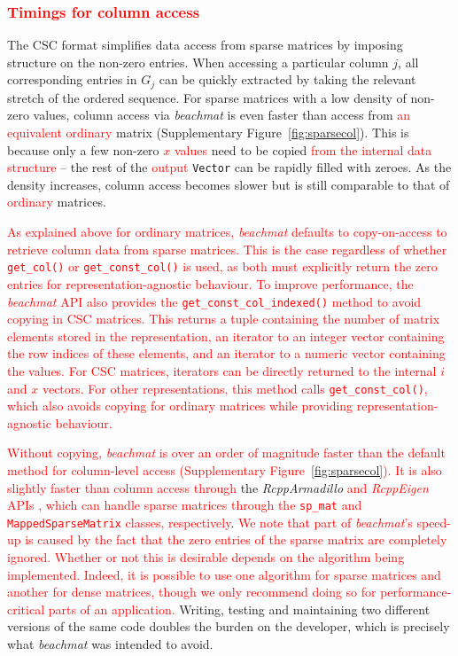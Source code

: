 \documentclass{article}
\newcommand{\beachmat}{\textit{beachmat}}
\newcommand{\code}[1]{\texttt{#1}}
\newcommand{\revised}[1]{\textcolor{red}{#1}}
\begin{document}

\subsubsection{\revised{Timings for column access}}
The CSC format simplifies data access from sparse matrices by imposing structure on the non-zero entries.
When accessing a particular column $j$, all corresponding entries in $G_j$ can be quickly extracted by taking the relevant stretch of the ordered sequence.
For sparse matrices with a low density of non-zero values, column access via \beachmat{} is even faster than access from \revised{an equivalent ordinary} matrix (Supplementary Figure~\ref{fig:sparsecol}).
This is because only a few non-zero \revised{$x$ values} need to be copied \revised{from the internal data structure} -- the rest of the \revised{output} \code{Vector} can be rapidly filled with zeroes.
As the density increases, column access becomes slower but is still comparable to that of \revised{ordinary} matrices.

\revised{As explained above for ordinary matrices, \beachmat{} defaults to copy-on-access to retrieve column data from sparse matrices.
This is the case regardless of whether \code{get\_col()} or \code{get\_const\_col()} is used, as both must explicitly return the zero entries for representation-agnostic behaviour.
To improve performance, the \beachmat{} API also provides the \code{get\_const\_col\_indexed()} method to avoid copying in CSC matrices.
This returns a tuple containing the number of matrix elements stored in the representation, an iterator to an integer vector containing the row indices of these elements, and an iterator to a numeric vector containing the values.
For CSC matrices, iterators can be directly returned to the internal $i$ and $x$ vectors.
For other representations, this method calls \code{get\_const\_col()}, which also avoids copying for ordinary matrices while providing representation-agnostic behaviour.}

\revised{Without copying, \beachmat{} is over an order of magnitude faster than the default method for column-level access (Supplementary Figure~\ref{fig:sparsecol}).
It is also slightly faster than column access through} the \textit{RcppArmadillo} \revised{and \textit{RcppEigen} APIs \cite{eddelbuettel2014arma,bates2013fast}, which can handle sparse matrices through the \code{sp\_mat} and \code{MappedSparseMatrix} classes, respectively}.
\revised{We note that part of \beachmat{}'s speed-up is caused by the fact that the zero entries of the sparse matrix are completely ignored.
Whether or not this is desirable depends on the algorithm being implemented.
Indeed, it is possible to use one algorithm for sparse matrices and another for dense matrices, though we only recommend doing so for performance-critical parts of an application.}
Writing, testing and maintaining two different versions of the same code doubles the burden on the developer, which is precisely what \beachmat{} was intended to avoid.
\end{document}
